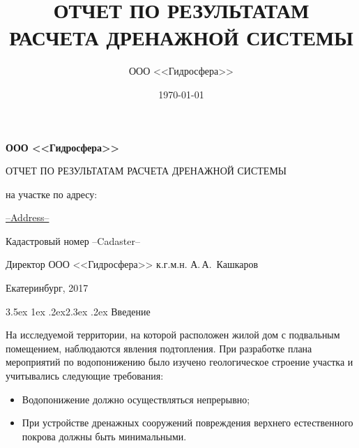 \documentclass[a4paper,12pt]{article} %
\author{ООО <<Гидросфера>>}\label{company}
\title{ОТЧЕТ ПО РЕЗУЛЬТАТАМ РАСЧЕТА ДРЕНАЖНОЙ СИСТЕМЫ}
\date{\today}
\makeatletter
\renewcommand\section{\@startsection {section}{1}{\parindent}%
	{3.5ex \@plus 1ex \@minus .2ex}{2.3ex \@plus.2ex}%
	{\normalfont\hyphenpenalty=10000\Large\bfseries}}
\newcommand{\txtExecutor}{ООО <<Гидросфера>>}	%
\newcommand{\txtYear}{2017}						%
\newcommand{\txtAddress}{--Address--}			%
\newcommand{\txtCadaster}{--Cadaster--} 		%
\makeatother
\begin{document}

\setlength{\extrarowheight}{1mm} %


\begin{titlepage}
	\begin{center}
		\textbf{\txtExecutor}
		\vspace{5.5cm}
		
		{\LARGE ОТЧЕТ ПО РЕЗУЛЬТАТАМ РАСЧЕТА ДРЕНАЖНОЙ СИСТЕМЫ}
		\vspace{0.25cm}
		
		\bigskip
		
		на участке по адресу:
				
		\underline{\txtAddress}
		
		\bigskip
		Кадастровый номер \txtCadaster
		
		\vfill
	
		\bigskip
		
	\end{center}

	\vfill
	
	\newlength{\ML}
	\hfill
	\begin{minipage}{1.0\textwidth}
		Директор ООО <<Гидросфера>> к.г.м.н.
		\underline{\hspace{\ML}} А.\,А.~Кашкаров\\
	\end{minipage}%
	
	\bigskip
	
	\vfill
	\begin{center}
		Екатеринбург, \txtYear
	\end{center}			

	\end{titlepage}


\section{Введение}

На исследуемой территории, на которой расположен жилой дом с подвальным помещением, наблюдаются явления подтопления. При разработке плана мероприятий по водопонижению было изучено геологическое строение участка и учитывались следующие требования:
\begin{itemize}
\item Водопонижение должно осуществляться непрерывно;
\item При устройстве дренажных сооружений повреждения верхнего естественного покрова должны быть минимальными.
\end{itemize}
\end{document}
